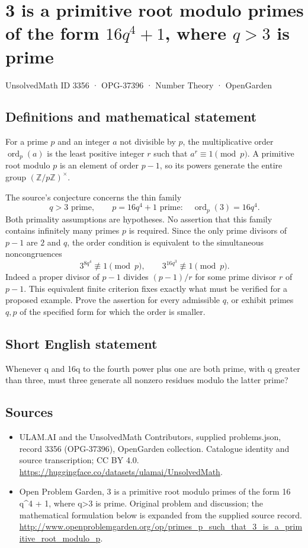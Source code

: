 \documentclass[11pt,a4paper]{article}
\begin{document}
\section*{3 is a primitive root modulo primes of the form $16q^4+1$, where $q>3$ is prime}\label{3356}
{\small UnsolvedMath ID 3356 · OPG-37396 · Number Theory · OpenGarden}
\subsection{Definitions and mathematical statement}
For a prime $p$ and an integer $a$ not divisible by $p$, the
multiplicative order $\operatorname{ord}_p(a)$ is the least positive
integer $r$ such that $a^r\equiv1\pmod p$. A primitive root modulo
$p$ is an element of order $p-1$, so its powers generate the entire
group $(\mathbb Z/p\mathbb Z)^\times$.

The source's conjecture concerns the thin family
\[
 q>3\text{ prime},\qquad p=16q^4+1\text{ prime}:
               \quad \operatorname{ord}_p(3)=16q^4.
\]
Both primality assumptions are hypotheses. No assertion that this
family contains infinitely many primes $p$ is required. Since the only
prime divisors of $p-1$ are $2$ and $q$, the order condition is
equivalent to the simultaneous noncongruences
\[
 3^{8q^4}\not\equiv1\pmod p,
 \qquad 3^{16q^3}\not\equiv1\pmod p.
\]
Indeed a proper divisor of $p-1$ divides $(p-1)/r$ for some prime
divisor $r$ of $p-1$. This equivalent finite criterion fixes exactly
what must be verified for a proposed example. Prove the assertion for
every admissible $q$, or exhibit primes $q,p$ of the specified form
for which the order is smaller.
\subsection{Short English statement}
Whenever q and 16q to the fourth power plus one are both prime, with q greater than three, must three generate all nonzero residues modulo the latter prime?
\subsection{Sources}
\begin{itemize}
\item[S1] ULAM.AI and the UnsolvedMath Contributors, supplied problems.json, record 3356 (OPG-37396), OpenGarden collection. Catalogue identity and source transcription; CC BY 4.0.
\url{https://huggingface.co/datasets/ulamai/UnsolvedMath}.
\item[S2] Open Problem Garden, 3 is a primitive root modulo primes of the form 16 q\textasciicircum{}4 + 1, where q>3 is prime. Original problem and discussion; the mathematical formulation below is expanded from the supplied source record.
\url{http://www.openproblemgarden.org/op/primes_p_such_that_3_is_a_primitive_root_modulo_p}.
\end{itemize}
\end{document}
